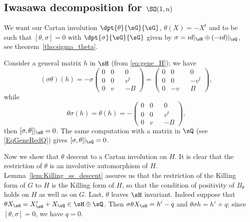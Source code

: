 \subsection{Iwasawa decomposition for \texorpdfstring{$\SO(1,n)$}{SO1n}}
\label{SubSecIwaSOunn}

We want our Cartan involution $\dpt{\theta}{\sG}{\sG}$, $\theta(X)=-X^t$ and to be such that $[\theta,\sigma]=0$ with $\dpt{\sigma}{\sG}{\sG}$ given by $\sigma=id|_{\sH}\oplus(-id)|_{\sQ}$, see theorem~\ref{tho:sigma_theta}.\label{pg:calcul_sigma_theta}

Consider a general matrix $h$ in $\sH$ (from \eqref{eq:gene_H}); we have
\[
	(\sigma\theta)(h)=-\sigma
	\begin{pmatrix}
		0 & 0 &  & 0   \\
		0 & 0 &  & v^t \\
		0 & v &  & -B
	\end{pmatrix}=
	\begin{pmatrix}
		0 & 0  &  & 0    \\
		0 & 0  &  & -v^t \\
		0 & -v &  & B
	\end{pmatrix},
\]
while
\[
	\theta\sigma(h)=\theta(h)=-
	\begin{pmatrix}
		0 & 0 &  & 0   \\
		0 & 0 &  & v^t \\
		0 & v &  & -B
	\end{pmatrix},
\]
then $[\sigma,\theta]|_{\sH}=0$. The same computation with a matrix in $\sQ$ (see \eqref{EqGeneRedQ}) gives $[\sigma,\theta]|_{\sQ}=0$.

Now we show that $\theta$ descent to a Cartan involution on $H$. It is clear that the restriction of $\theta$ is an involutive automorphism of $H$. Lemma~\ref{lem:Killing_ss_descent} assures us that the restriction of the Killing form of $G$ to $H$ is the Killing form of $H$, so that the condition of positivity of $B_{\theta}$ holds on $H$ as well as on $G$. Last, $\theta$ leaves $\sH$ invariant. Indeed suppose that  $\theta X_{\sH}=X'_{\sH}+X_{\sQ}\in\sH\oplus\sQ$. Then $\sigma\theta X_{\sH}=h'-q$ and $\theta\sigma h=h'+q$; since $[\theta,\sigma]=0$, we have $q=0$.

